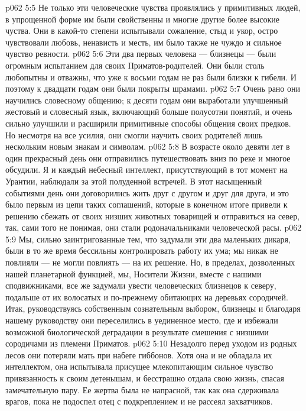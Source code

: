 \vs p062 5:5 Не только эти человеческие чувства проявлялись у примитивных людей, в упрощенной форме им были свойственны и многие другие более высокие чуства. Они в какой\hyp{}то степени испытывали сожаление, стыд и укор, остро чувствовали любовь, ненависть и месть, им было также не чуждо и сильное чувство ревности.
\vs p062 5:6 Эти два первых человека --- близнецы --- были огромным испытанием для своих Приматов\hyp{}родителей. Они были столь любопытны и отважны, что уже к восьми годам не раз были близки к гибели. И поэтому к двадцати годам они были покрыты шрамами.
\vs p062 5:7 Очень рано они научились словесному общению; к десяти годам они выработали улучшенный жестовый и словесный язык, включающий больше полусотни понятий, и очень сильно улучшили и расширили примитивные способы общения своих предков. Но несмотря на все усилия, они смогли научить своих родителей лишь нескольким новым знакам и символам.
\vs p062 5:8 В возрасте около девяти лет в один прекрасный день они отправились путешествовать вниз по реке и многое обсудили. Я и каждый небесный интеллект, присутствующий в тот момент на Урантии, наблюдали за этой полуденной встречей. В этот насыщенный событиями день они договорились жить друг с другом и друг для друга, и это было первым из цепи таких соглашений, которые в конечном итоге привели к решению сбежать от своих низших животных товарищей и отправиться на север, так, сами того не понимая, они стали родоначальниками человеческой расы.
\vs p062 5:9 Мы, сильно заинтригованные тем, что задумали эти два маленьких дикаря, были в то же время бессильны контролировать работу их ума; мы никак не повлияли --- не могли повлиять --- на их решение. Но, в пределах, дозволенных нашей планетарной функцией, мы, Носители Жизни, вместе с нашими сподвижниками, все же задумали увести человеческих близнецов к северу, подальше от их волосатых и по\hyp{}прежнему обитающих на деревьях сородичей. Итак, руководствуясь собственным сознательным выбором, близнецы  и благодаря нашему руководству они переселились  в уединенное место, где и избежали возможной биологической деградации в результате смешения с низшими сородичами из племени Приматов.
\vs p062 5:10 Незадолго перед уходом из родных лесов они потеряли мать при набеге гиббонов. Хотя она и не обладала их интеллектом, она испытывала присущее млекопитающим сильное чувство привязанность к своим детенышам, и бесстрашно отдала свою жизнь, спасая замечательную пару. Ее жертва была не напрасной, так как она сдерживала врагов, пока не подоспел отец с подкреплением и не рассеял захватчиков.
